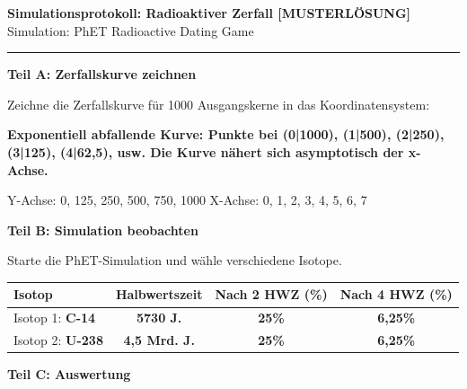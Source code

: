 \documentclass[10pt, a4paper]{article}
\newcommand{\fachfarbe}{physik}
\newcommand{\lsg}[1]{\textcolor{loesung}{\textbf{#1}}}
\newcommand{\abschnitt}[1]{%
    \vspace{8pt}\noindent\textbf{\textcolor{\fachfarbe}{#1}}\vspace{4pt}
}
\begin{document}

\newpage

\begin{center}
{\large\bfseries Simulationsprotokoll: Radioaktiver Zerfall \textcolor{loesung}{[MUSTERLÖSUNG]}}\\[2pt]
{\small\textcolor{grau}{Simulation: PhET Radioactive Dating Game}}
\end{center}
\vspace{-2pt}\hrule\vspace{12pt}

\abschnitt{Teil A: Zerfallskurve zeichnen}

\begin{merksatz}[Koordinatensystem]
Zeichne die Zerfallskurve für 1000 Ausgangskerne in das Koordinatensystem:

\vspace{8pt}
\lsg{Exponentiell abfallende Kurve: Punkte bei (0|1000), (1|500), (2|250), (3|125), (4|62,5), usw. Die Kurve nähert sich asymptotisch der x-Achse.}
\vspace{50pt}

Y-Achse: 0, 125, 250, 500, 750, 1000 \quad X-Achse: 0, 1, 2, 3, 4, 5, 6, 7

\end{merksatz}

\vspace{8pt}

\abschnitt{Teil B: Simulation beobachten}

Starte die PhET-Simulation und wähle verschiedene Isotope.

\vspace{6pt}

\begin{tabular}{|l|c|c|c|}
\hline
\textbf{Isotop} & \textbf{Halbwertszeit} & \textbf{Nach 2 HWZ (\%)} & \textbf{Nach 4 HWZ (\%)} \\
\hline
Isotop 1: \lsg{C-14} & \lsg{5730 J.} & \lsg{25\%} & \lsg{6,25\%} \\
\hline
Isotop 2: \lsg{U-238} & \lsg{4,5 Mrd. J.} & \lsg{25\%} & \lsg{6,25\%} \\
\hline
\end{tabular}

\vspace{12pt}

\abschnitt{Teil C: Auswertung}
\end{document}
